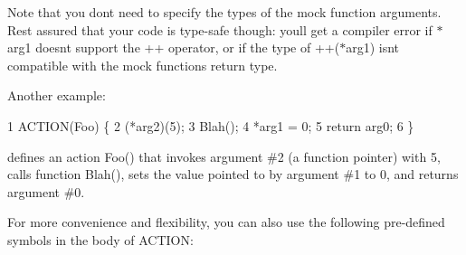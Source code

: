 Note that you don\textquotesingle{}t need to specify the types of the mock function arguments. Rest assured that your code is type-\/safe though\+: you\textquotesingle{}ll get a compiler error if {\ttfamily $\ast$arg1} doesn\textquotesingle{}t support the {\ttfamily ++} operator, or if the type of {\ttfamily ++($\ast$arg1)} isn\textquotesingle{}t compatible with the mock function\textquotesingle{}s return type.

Another example\+: 
\begin{DoxyCode}
1 ACTION(Foo) \{
2   (*arg2)(5);
3   Blah();
4   *arg1 = 0;
5   return arg0;
6 \}
\end{DoxyCode}
 defines an action {\ttfamily Foo()} that invokes argument \#2 (a function pointer) with 5, calls function {\ttfamily Blah()}, sets the value pointed to by argument \#1 to 0, and returns argument \#0.

For more convenience and flexibility, you can also use the following pre-\/defined symbols in the body of {\ttfamily A\+C\+T\+I\+ON}\+:

